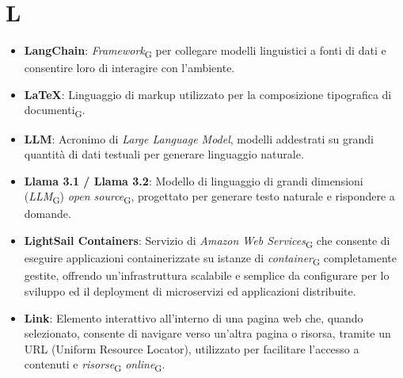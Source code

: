 \section{L}
\begin{itemize}
    \item \textbf{LangChain}: \textit{Framework}\textsubscript{G} per collegare modelli linguistici a fonti di dati e consentire loro di interagire con l'ambiente.
    \item \textbf{LaTeX}: Linguaggio di markup utilizzato per la composizione tipografica di documenti\textsubscript{G}.
    \item \textbf{LLM}: Acronimo di \textit{Large Language Model}, modelli addestrati su grandi quantità di dati testuali per generare linguaggio naturale.
    \item \textbf{Llama 3.1 / Llama 3.2}: Modello di linguaggio di grandi dimensioni (\textit{LLM}\textsubscript{G}) \textit{open source}\textsubscript{G}, progettato per generare testo naturale e rispondere a domande.
    \item \textbf{LightSail Containers}: Servizio di \textit{Amazon Web Services}\textsubscript{G} che consente di eseguire applicazioni containerizzate su istanze di \textit{container}\textsubscript{G} completamente gestite, offrendo un'infrastruttura scalabile e semplice da configurare per lo sviluppo ed il deployment di microservizi ed applicazioni distribuite.
    \item \textbf{Link}: Elemento interattivo all'interno di una pagina web che, quando selezionato, consente di navigare verso un'altra pagina o risorsa, tramite un URL (Uniform Resource Locator), utilizzato per facilitare l'accesso a contenuti e \textit{risorse}\textsubscript{G} \textit{online}\textsubscript{G}.
\end{itemize}
